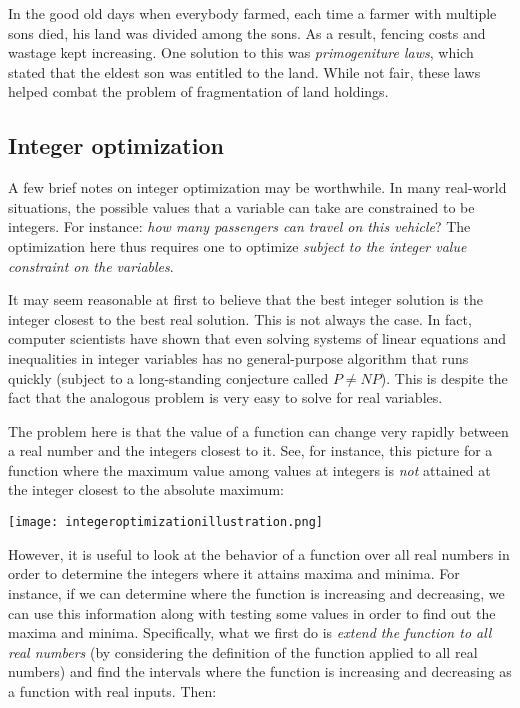 \documentclass[10pt]{amsart}
\begin{document}
In the good old days when everybody farmed, each time a farmer with
multiple sons died, his land was divided among the sons. As a result,
fencing costs and wastage kept increasing. One solution to this was
{\em primogeniture laws}, which stated that the eldest son was
entitled to the land. While not fair, these laws helped combat the
problem of fragmentation of land holdings.
\subsection{Integer optimization}

A few brief notes on integer optimization may be worthwhile. In many
real-world situations, the possible values that a variable can take
are constrained to be integers. For instance: {\em how many passengers
can travel on this vehicle}? The optimization here thus requires one
to optimize {\em subject to the integer value constraint on the
variables}.

It may seem reasonable at first to believe that the best integer
solution is the integer closest to the best real solution. This is not
always the case. In fact, computer scientists have shown that even
solving systems of linear equations and inequalities in integer
variables has no general-purpose algorithm that runs quickly (subject
to a long-standing conjecture called $P \ne NP$). This is despite the
fact that the analogous problem is very easy to solve for real
variables.

The problem here is that the value of a function can change very
rapidly between a real number and the integers closest to it. See, for
instance, this picture for a function where the maximum value among
values at integers is {\em not} attained at the integer closest to the
absolute maximum:

\texttt{[image: integeroptimizationillustration.png]}

However, it is useful to look at the behavior of a function over all
real numbers in order to determine the integers where it attains
maxima and minima. For instance, if we can determine where the
function is increasing and decreasing, we can use this information
along with testing some values in order to find out the maxima and
minima. Specifically, what we first do is {\em extend the function to
all real numbers} (by considering the definition of the function
applied to all real numbers) and find the intervals where the function
is increasing and decreasing as a function with real inputs. Then:
\end{document}
